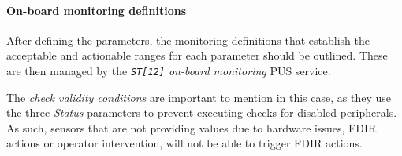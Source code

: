 \documentclass[a4paper,nobib]{tufte-book}
\begin{document}
\paragraph{On-board monitoring definitions}

After defining the parameters, the monitoring definitions that establish the acceptable and actionable ranges for each parameter should be outlined. These are then managed by the \emph{\texttt{ST[12]} on-board monitoring} \ac{PUS} service.

The \emph{check validity conditions} are important to mention in this case, as they use the three \emph{Status} parameters to prevent executing checks for disabled peripherals. As such, sensors that are not providing values due to hardware issues, \ac{FDIR} actions or operator intervention, will not be able to trigger \ac{FDIR} actions.
\end{document}
